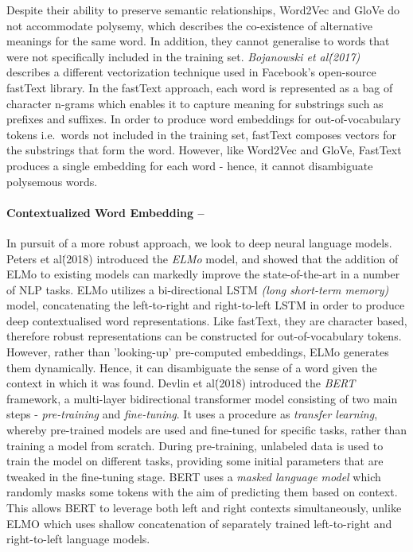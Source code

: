 \documentclass[12pt,a4paper]{article}
\begin{document}
Despite their ability to preserve semantic relationships, Word2Vec and GloVe do not accommodate polysemy, which describes the co-existence of alternative meanings for the same word. In addition, they cannot generalise to words that were not specifically included in the training set. \textit{Bojanowski et al\. (2017)} \cite{bojanowski2016enriching} describes a different vectorization technique used in Facebook's open-source fastText library. In the fastText approach, each word is represented as a bag of character n-grams which enables it to capture meaning for substrings such as prefixes and suffixes. In order to produce word embeddings for out-of-vocabulary tokens i.e.\ words not included in the training set, fastText composes vectors for the substrings that form the word. However, like Word2Vec and GloVe, FastText produces a single embedding for each word - hence, it cannot disambiguate polysemous words.

\paragraph{Contextualized Word Embedding --}
In pursuit of a more robust approach, we look to deep neural language models. Peters et al\. (2018) \cite{peters2018deep} introduced the \textit{ELMo} model, and showed that the addition of ELMo to existing models can markedly improve the state-of-the-art in a number of NLP tasks. ELMo utilizes a bi-directional LSTM \textit{(long short-term memory)} model, concatenating the left-to-right and right-to-left LSTM in order to produce deep contextualised word representations. Like fastText, they are character based, therefore robust representations can be constructed for out-of-vocabulary tokens. However, rather than 'looking-up' pre-computed embeddings, ELMo generates them dynamically. Hence, it can disambiguate the sense of a word given the context in which it was found.
Devlin et al\. (2018) \cite{devlin2018bert} introduced the \textit{BERT} framework, a multi-layer bidirectional transformer model consisting of two main steps - \textit{pre-training} and \textit{fine-tuning}. It uses a  procedure as \textit{transfer learning}, whereby pre-trained models are used and fine-tuned for specific tasks, rather than training a model from scratch. During pre-training, unlabeled data is used to train the model on different tasks, providing some initial parameters that are tweaked in the fine-tuning stage. BERT uses a \textit{masked language model} which randomly masks some tokens with the aim of predicting them based on context. This allows BERT to leverage both left and right contexts simultaneously, unlike ELMO which uses shallow concatenation of separately trained left-to-right and right-to-left language models. 
\vfill
\end{document}
